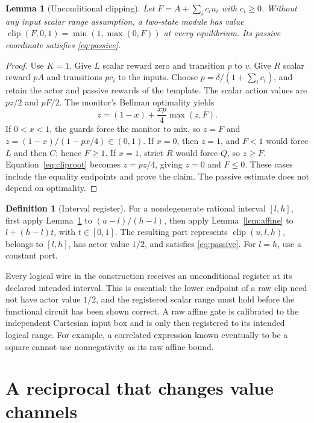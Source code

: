 \documentclass[11pt,a4paper]{article}
\numberwithin{equation}{section}
\newtheorem{lemma}[theorem]{Lemma}
\theoremstyle{definition}
\newtheorem{definition}[theorem]{Definition}
\DeclareMathOperator{\clip}{clip}
\begin{document}
\begin{lemma}[Unconditional clipping]\label{lem:clip}
Let \(F=A+\sum_i c_i u_i\) with \(c_i\geq0\). Without any input scalar
range assumption, a two-state module has value
\(\clip(F,0,1)=\min(1,\max(0,F))\) at every equilibrium.
Its passive coordinate satisfies \eqref{eq:passive}.
\end{lemma}
\begin{proof}
Use \(K=1\). Give \(L\) scalar reward zero and transition \(p\) to
\(v\). Give \(R\) scalar reward \(pA\) and transitions \(pc_i\) to
the inputs. Choose \(p=\delta/(1+\sum_i c_i)\), and retain the actor
and passive rewards of the template. The scalar action values are
\(pz/2\) and \(pF/2\). The monitor's Bellman optimality yields
\begin{equation}\label{eq:cliproot}
 z=(1-x)+\frac{xp}{4}\max(z,F).
\end{equation}
If \(0<x<1\), the guards force the monitor to mix, so \(z=F\) and
\(z=(1-x)/(1-px/4)\in(0,1)\). If \(x=0\), then \(z=1\), and
\(F<1\) would force \(L\) and then \(C\); hence \(F\geq1\).
If \(x=1\), strict \(R\) would force \(Q\), so \(z\geq F\).
Equation~\eqref{eq:cliproot} becomes \(z=pz/4\), giving \(z=0\) and
\(F\leq0\). These cases include the equality endpoints and prove the
claim. The passive estimate does not depend on optimality.
\end{proof}

\begin{definition}[Interval register]\label{def:register}
For a nondegenerate rational interval \([l,h]\), first apply
Lemma~\ref{lem:clip} to \((u-l)/(h-l)\), then apply
Lemma~\ref{lem:affine} to \(l+(h-l)t\), with \(t\in[0,1]\).
The resulting port represents \(\clip(u,l,h)\), belongs to \([l,h]\),
has actor value \(1/2\), and satisfies \eqref{eq:passive}.
For \(l=h\), use a constant port.
\end{definition}

Every logical wire in the construction receives an unconditional
register at its declared intended interval. This is essential: the
lower endpoint of a raw clip need not have actor value \(1/2\), and
the registered scalar range must hold before the functional circuit has
been shown correct. A raw affine gate is calibrated to the independent
Cartesian input box and is only then registered to its intended logical
range. For example, a correlated expression known eventually to be a
square cannot use nonnegativity as its raw affine bound.

\section{A reciprocal that changes value channels}\label{sec:recip}
\end{document}
